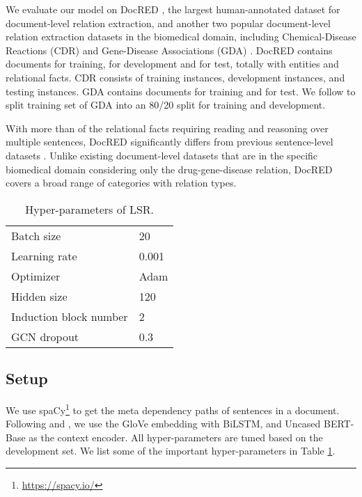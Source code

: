 \documentclass[11pt,a4paper]{article}
\begin{document}
We evaluate our model on DocRED \citep{yao2019DocRED}, the largest human-annotated dataset for document-level relation extraction, and another two popular document-level relation extraction datasets in the biomedical domain, including Chemical-Disease Reactions (CDR)  \cite{Li2016BioCreativeVC} and Gene-Disease Associations (GDA) \cite{wu2019renet}. DocRED contains  documents for training,  for development and  for test, totally with  entities and  relational facts. CDR consists of  training instances,  development instances, and  testing instances. GDA contains  documents for training and  for test. We follow \cite{christopoulou2019connecting} to split training set of GDA into an 80/20 split for training and development.

With more than  of the relational facts requiring reading and reasoning over multiple sentences, DocRED significantly differs from previous sentence-level datasets \citep{Doddington2004TheAC, Hendrickx2009SemEval2010T8, Zhang2018GraphCO}. Unlike existing document-level datasets \citep{Li2016BioCreativeVC, Quirk2017DistantSF, Peng2017CrossSentenceNR, Verga2018SimultaneouslyST, Jia2019DocumentLevelNR} that are in the specific biomedical domain considering only the drug-gene-disease relation, DocRED covers a broad range of categories with  relation types.

\begin{table}[h]
\centering
\begin{tabular}{ll}
\toprule
Batch size       & 20      \\
Learning rate    & 0.001        \\
Optimizer        & Adam       \\
Hidden size & 120 \\
Induction block number & 2 \\
GCN dropout & 0.3\\
\bottomrule
\end{tabular}
\caption{\label{tab:hyper} Hyper-parameters of LSR.}
\vspace{-4mm}
\end{table}
\vspace{-2mm}
\subsection{Setup}
\label{ssec:4.2}
We use spaCy\footnote{\url{https://spacy.io/}} to get the meta dependency paths of sentences in a document. Following \citet{yao2019DocRED} and \citet{wang2019fine}, we use the GloVe \citep{Pennington2014GloveGV} embedding with BiLSTM, and Uncased BERT-Base \citep{Devlin2019BERTPO} as the context encoder. All hyper-parameters are tuned based on the development set. We list some of the important hyper-parameters in Table \ref{tab:hyper}. 
\end{document}
